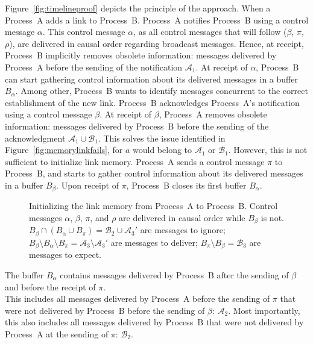 Figure~\ref{fig:timelineproof} depicts the principle of the approach. When a
Process~A adds a link to
Process~B. %
Process~A notifies Process~B using a control message $\alpha$. This control
message $\alpha$, as all control messages that will follow ($\beta$, $\pi$,
$\rho$), are delivered in causal order regarding broadcast messages. Hence, at
receipt, Process~B implicitly removes obsolete information: messages delivered
by Process~A before the sending of the notification $\mathcal{A}_1$. 
At receipt
of $\alpha$, Process~B can start gathering control information about its
delivered messages in a buffer $B_\alpha$. Among other, Process~B wants to
identify messages concurrent to the correct establishment of the new
link. Process~B acknowledges Process~A's notification using a control message
$\beta$. At receipt of $\beta$, Process~A removes obsolete information: messages
delivered by Process~B before the sending of the acknowledgment
$\mathcal{A}_1 \cup \mathcal{B}_1$. This solves the issue
identified in Figure~\ref{fig:memorylinkfails}, for $a$ would belong to $\mathcal{A}_1$
or $\mathcal{B}_1$. However, this is not sufficient to initialize link memory.
Process~A sends a control message $\pi$ to
Process~B, and starts to gather control information about its delivered messages
in a buffer $B_\beta$. Upon receipt of $\pi$, Process~B closes its first buffer
$B_\alpha$.

\begin{figure}
  \begin{center}
    
    \caption{\label{fig:timelineproof}\label{fig:timeline}Initializing the link
      memory from Process~A to Process~B. Control messages $\alpha$, $\beta$,
      $\pi$, and $\rho$ are delivered in causal order while $B_\beta$ is not.
      $B_\beta \cap (B_\alpha \cup B_\pi) = \mathcal{B}_2 \cup \mathcal{A}_3'$
      are messages to ignore;
      $B_\beta \setminus B_\alpha \setminus B_\pi = \mathcal{A}_3\setminus
      \mathcal{A}_3'$
      are messages to deliver; $B_\pi \setminus B_\beta = \mathcal{B}_3$ are
      messages to expect.}
  \end{center}
\end{figure}

  
\begin{lemma}
  The buffer $B_\alpha$ contains messages delivered by Process~B after the
  sending of $\beta$ and before the receipt of $\pi$.\\
  This includes all messages delivered by Process~A before the sending of $\pi$
  that were not delivered by Process~B before the sending of $\beta$:
  $\mathcal{A}_2$. Most importantly, this also includes all messages delivered
  by Process~B that were not delivered by Process~A at the sending of $\pi$:
  $\mathcal{B}_2$.
\end{lemma}

